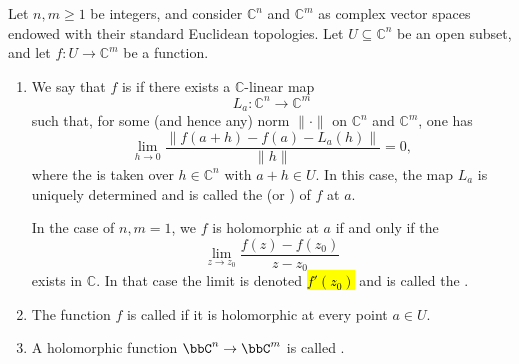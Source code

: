 \begin{definition} \label{definition:holomorphic_function_from_a_subset_of_Cn_to_Cm}
Let $n,m \geq 1$ be integers, and consider $\mathbb{C}^n$ and $\mathbb{C}^m$ as complex vector spaces endowed with their standard Euclidean topologies. Let $U \subseteq \mathbb{C}^n$ be an open subset, and let $f : U \to \mathbb{C}^m$ be a function.
  \begin{enumerate}
    \item We say that $f$ is  if there exists a $\mathbb{C}$-linear map
    $$ L_a : \mathbb{C}^n \to \mathbb{C}^m $$
    such that, for some (and hence any) norm $\|\cdot\|$ on $\mathbb{C}^n$ and $\mathbb{C}^m$, one has
    $$ \lim_{h \to 0} \frac{\| f(a+h) - f(a) - L_a(h) \|}{\|h\|} = 0, $$
    where the  is taken over $h \in \mathbb{C}^n$ with $a+h \in U$.
    In this case, the map $L_a$ is uniquely determined and is called the  (or ) of $f$ at $a$. 

    In the case of $n,m = 1$, we $f$ is holomorphic at $a$ if and only if the 
    $$\lim_{z \to z_0} \frac{f(z) - f(z_0)}{z - z_0}$$
    exists in $\mathbb{C}$. In that case the limit is denoted \hl{$f'(z_0)$} and is called the .
    

    \item The function $f$ is called  if it is holomorphic at every point $a \in U$.

    \item A holomorphic function $\bbC^n \to \bbC^m$ is called .

  \end{enumerate}
\end{definition}